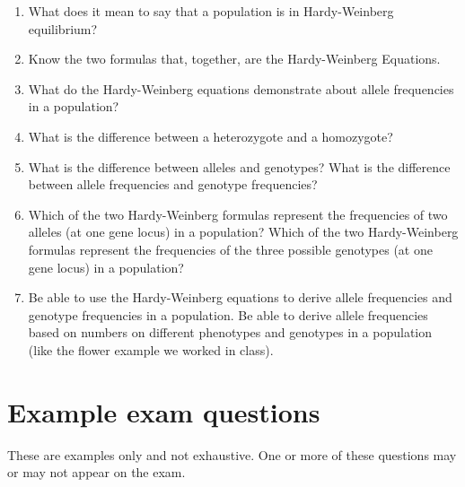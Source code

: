 \documentclass[letterpaper]{tufte-handout}
\begin{document}
\begin{enumerate}

	\item What does it mean to say that a population is in Hardy-Weinberg equilibrium?

	\item Know the two formulas that, together, are the Hardy-Weinberg Equations.

	\item What do the Hardy-Weinberg equations demonstrate about allele frequencies in a population?

	\item What is the difference between a heterozygote and a homozygote?

	\item What is the difference between alleles and genotypes?  What is the difference between allele frequencies and genotype frequencies?

	\item Which of the two Hardy-Weinberg formulas represent the frequencies of two alleles (at one gene locus) in a population?  Which of the two Hardy-Weinberg formulas represent the frequencies of the three possible genotypes (at one gene locus) in a population?

	\item Be able to use the Hardy-Weinberg equations to derive allele frequencies and genotype frequencies in a population.  Be able to derive allele frequencies based on numbers on different phenotypes and genotypes in a population (like the flower example we worked in class). 
	

\end{enumerate}

\section*{Example exam questions}

These are examples only and not exhaustive. One or more of these questions may or may not appear on the exam.

\bigskip
\end{document}
